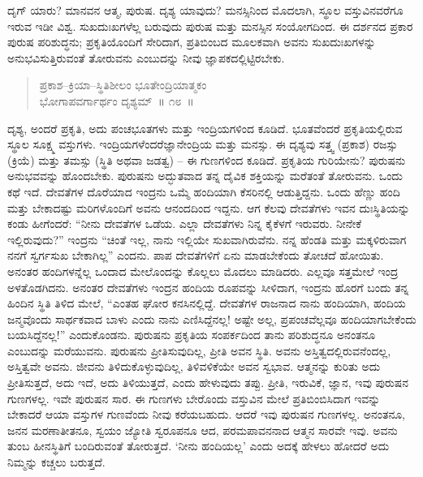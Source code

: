 

\vskip 0.2cm

ದೃಗ್​ ಯಾರು? ಮಾನವನ ಆತ್ಮ, ಪುರುಷ. ದೃಶ್ಯ ಯಾವುದು? ಮನಸ್ಸಿನಿಂದ ಮೊದಲಾಗಿ, ಸ್ಥೂಲ ವಸ್ತುವಿನವರೆಗೂ ಇರುವ ಇಡೀ ವಿಶ್ವ. ಸುಖದುಃಖಗಳೆಲ್ಲ ಬರುವುದು ಪುರುಷ ಮತ್ತು ಮನಸ್ಸಿನ ಸಂಯೋಗದಿಂದ. ಈ ದರ್ಶನದ ಪ್ರಕಾರ ಪುರುಷ ಪರಿಶುದ್ಧನು; ಪ್ರಕೃತಿಯೊಂದಿಗೆ ಸೇರಿದಾಗ, ಪ್ರತಿಬಿಂಬದ ಮೂಲಕವಾಗಿ ಅವನು ಸುಖದುಃಖಗಳನ್ನು ಅನುಭವಿಸುತ್ತಿರುವಂತೆ ತೋರುವನು ಎಂಬುದನ್ನು ನೀವು ಜ್ಞಾಪಕದಲ್ಲಿಟ್ಟಿರಬೇಕು. 


\begin{verse}
ಪ್ರಕಾಶ–ಕ್ರಿಯಾ–ಸ್ಥಿತಿಶೀಲಂ ಭೂತೇಂದ್ರಿಯಾತ್ಮಕಂ\\ ಭೋಗಾಪವರ್ಗಾರ್ಥಂ ದೃಶ್ಯಮ್​~॥ ೧೮~॥
\end{verse}



\vskip 0.2cm

ದೃಶ್ಯ, ಅಂದರೆ ಪ್ರಕೃತಿ, ಅದು ಪಂಚಭೂತಗಳು ಮತ್ತು ಇಂದ್ರಿಯಗಳಿಂದ ಕೂಡಿದೆ. ಭೂತವೆಂದರೆ ಪ್ರಕೃತಿಯಲ್ಲಿರುವ ಸ್ಥೂಲ ಸೂಕ್ಷ್ಮ ವಸ್ತುಗಳು. ಇಂದ್ರಿಯಗಳೆಂದರೆ\break ಜ್ಞಾನೇಂದ್ರಿಯ ಮತ್ತು ಮನಸ್ಸು. ಈ ದೃಶ್ಯವು ಸತ್ತ್ವ (ಪ್ರಕಾಶ) ರಜಸ್ಸು (ಕ್ರಿಯೆ) ಮತ್ತು ತಮಸ್ಸು (ಸ್ಥಿತಿ ಅಥವಾ ಜಡತ್ವ) – ಈ ಗುಣಗಳಿಂದ ಕೂಡಿದೆ. ಪ್ರಕೃತಿಯ ಗುರಿಯೇನು? ಪುರುಷನು ಅನುಭವವನ್ನು ಹೊಂದಬೇಕು. ಪುರುಷನು ಅದ್ಭುತವಾದ ತನ್ನ ದೈವಿಕ ಶಕ್ತಿಯನ್ನು ಮರೆತಂತೆ ತೋರುವನು. ಒಂದು ಕಥೆ ಇದೆ. ದೇವತೆಗಳ ದೊರೆಯಾದ ಇಂದ್ರನು ಒಮ್ಮೆ ಹಂದಿಯಾಗಿ ಕೆಸರಿನಲ್ಲಿ ಆಡುತ್ತಿದ್ದನು. ಒಂದು ಹೆಣ್ಣು ಹಂದಿ ಮತ್ತು ಬೇಕಾದಷ್ಟು ಮರಿಗಳೊಂದಿಗೆ ಅವನು ಆನಂದದಿಂದ ಇದ್ದನು. ಆಗ ಕೆಲವು ದೇವತೆಗಳು ಇವನ ದುಃಸ್ಥಿತಿಯನ್ನು ಕಂಡು ಹೀಗೆಂದರೆ: “ನೀನು ದೇವತೆಗಳ ಒಡೆಯ. ಎಲ್ಲಾ ದೇವತೆಗಳು ನಿನ್ನ ಕೈಕೆಳಗೆ ಇರುವರು. ನೀನೇಕೆ ಇಲ್ಲಿರುವುದು?” ಇಂದ್ರನು “ಚಿಂತೆ ಇಲ್ಲ, ನಾನು ಇಲ್ಲಿಯೇ ಸುಖ\break ವಾಗಿರುವೆನು. ನನ್ನ ಹೆಂಡತಿ ಮತ್ತು ಮಕ್ಕಳಿರುವಾಗ ನನಗೆ ಸ್ವರ್ಗಸುಖ ಬೇಕಾಗಿಲ್ಲ” ಎಂದನು. ಪಾಪ ದೇವತೆಗಳಿಗೆ ಏನು ಮಾಡಬೇಕೆಂದು ತೋಚದೆ ಹೋಯಿತು. ಅನಂತರ ಹಂದಿಗಳನ್ನೆಲ್ಲ ಒಂದಾದ ಮೇಲೊಂದನ್ನು ಕೊಲ್ಲಲು ಮೊದಲು ಮಾಡಿದರು. ಎಲ್ಲವೂ ಸತ್ತಮೇಲೆ ಇಂದ್ರ ಅಳತೊಡಗಿದನು. ಅನಂತರ ದೇವತೆಗಳು ಇಂದ್ರನ ಹಂದಿಯ ರೂಪವನ್ನು ಸೀಳಿದಾಗ, ಇಂದ್ರನು ಹೊರಗೆ ಬಂದು ತನ್ನ ಹಿಂದಿನ ಸ್ಥಿತಿ ತಿಳಿದ ಮೇಲೆ, “ಎಂತಹ ಘೋರ ಕನಸಿನಲ್ಲಿದ್ದೆ. ದೇವತೆಗಳ ರಾಜನಾದ ನಾನು ಹಂದಿಯಾಗಿ, ಹಂದಿಯ ಜನ್ಮವೊಂದು ಸಾರ್ಥಕವಾದ ಬಾಳು ಎಂದು ನಾನು ಎಣಿಸಿದ್ದೆನಲ್ಲ! ಅಷ್ಟೇ ಅಲ್ಲ, ಪ್ರಪಂಚವೆಲ್ಲವೂ ಹಂದಿಯಾಗಬೇಕೆಂದು ಬಯಸಿದ್ದೆನಲ್ಲ!” ಎಂದುಕೊಂಡನು. ಪುರುಷನು ಪ್ರಕೃತಿಯ ಸಂಪರ್ಕದಿಂದ ತಾನು ಪರಿಶುದ್ಧನೂ ಅನಂತನೂ ಎಂಬುದನ್ನು ಮರೆಯುವನು. ಪುರುಷನು ಪ್ರೀತಿಸುವುದಿಲ್ಲ, ಪ್ರೀತಿ ಅವನ ಸ್ಥಿತಿ. ಅವನು ಅಸ್ತಿತ್ವದಲ್ಲಿರುವನೆಂದಲ್ಲ, ಅಸ್ತಿತ್ವವೇ ಅವನು. ಜೀವನು ತಿಳಿದುಕೊಳ್ಳುವುದಿಲ್ಲ, ತಿಳಿವಳಿಕೆಯೇ ಅವನ ಸ್ವಭಾವ. ಆತ್ಮನನ್ನು ಕುರಿತು ಅದು ಪ್ರೀತಿಸುತ್ತದೆ, ಅದು ಇದೆ, ಅದು ತಿಳಿಯುತ್ತದೆ, ಎಂದು ಹೇಳುವುದು ತಪ್ಪು. ಪ್ರೀತಿ, ಇರುವಿಕೆ, ಜ್ಞಾನ, ಇವು ಪುರುಷನ ಗುಣಗಳಲ್ಲ. ಇವೇ ಪುರುಷನ ಸಾರ. ಈ ಗುಣಗಳು ಬೇರೊಂದು ವಸ್ತುವಿನ ಮೇಲೆ ಪ್ರತಿಬಿಂಬಿಸಿದಾಗ ಇವನ್ನು ಬೇಕಾದರೆ ಆಯಾ ವಸ್ತುಗಳ ಗುಣವೆಂದು ನೀವು ಕರೆಯಬಹುದು. ಆದರೆ ಇವು ಪುರುಷನ ಗುಣಗಳಲ್ಲ. ಅನಂತನೂ, ಜನನ ಮರಣಾತೀತನೂ, ಸ್ವಯಂ ಜ್ಯೋತಿ ಸ್ವರೂಪನೂ ಆದ, ಪರಮಪಾವನನಾದ ಆತ್ಮನ ಸಾರವೇ ಇವು. ಅವನು ತುಂಬ ಹೀನಸ್ಥಿತಿಗೆ ಬಂದಿರುವಂತೆ ತೋರುತ್ತದೆ. ‘ನೀನು ಹಂದಿಯಲ್ಲ’ ಎಂದು ಅದಕ್ಕೆ ಹೇಳಲು ಹೋದರೆ ಅದು ನಿಮ್ಮನ್ನು ಕಚ್ಚಲು ಬರುತ್ತದೆ. 

